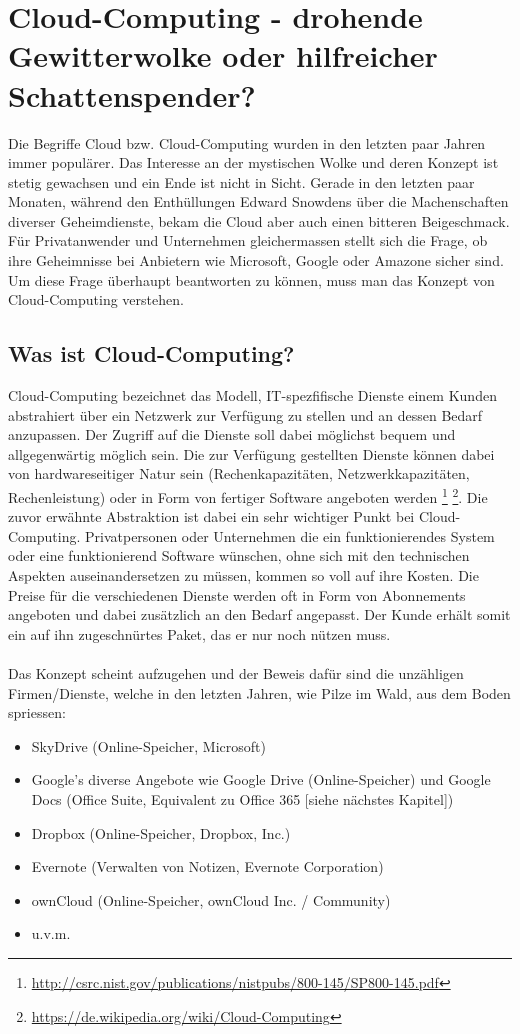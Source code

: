 \section{Cloud-Computing - drohende Gewitterwolke oder hilfreicher Schattenspender?}
Die Begriffe Cloud bzw. Cloud-Computing wurden in den letzten paar Jahren immer populärer. Das Interesse an der mystischen Wolke und deren Konzept ist stetig gewachsen und ein Ende ist nicht in Sicht. Gerade in den letzten paar Monaten, während den Enthüllungen Edward Snowdens über die Machenschaften diverser Geheimdienste, bekam die Cloud aber auch einen bitteren Beigeschmack. Für Privatanwender und Unternehmen gleichermassen stellt sich die Frage, ob ihre Geheimnisse bei Anbietern wie Microsoft, Google oder Amazone sicher sind. Um diese Frage überhaupt beantworten zu können, muss man das Konzept von Cloud-Computing verstehen.

\subsection{Was ist Cloud-Computing?}
Cloud-Computing bezeichnet das Modell, IT-spezfifische Dienste einem Kunden abstrahiert über ein Netzwerk zur Verfügung zu stellen und an dessen Bedarf anzupassen. Der Zugriff auf die Dienste soll dabei möglichst bequem und allgegenwärtig möglich sein. Die zur Verfügung gestellten Dienste können dabei von hardwareseitiger Natur sein (Rechenkapazitäten, Netzwerkkapazitäten, Rechenleistung) oder in Form von fertiger Software angeboten werden 
\footnote{\url{http://csrc.nist.gov/publications/nistpubs/800-145/SP800-145.pdf}} 
\footnote{\url{https://de.wikipedia.org/wiki/Cloud-Computing}}. 
Die zuvor erwähnte Abstraktion ist dabei ein sehr wichtiger Punkt bei Cloud-Computing. Privatpersonen oder Unternehmen die ein funktionierendes System oder eine funktionierend Software wünschen, ohne sich mit den technischen Aspekten auseinandersetzen zu müssen, kommen so voll auf ihre Kosten. Die Preise für die verschiedenen Dienste werden oft in Form von Abonnements angeboten und dabei zusätzlich an den Bedarf angepasst. Der Kunde erhält somit ein auf ihn zugeschnürtes Paket, das er nur noch nützen muss.
\\
\\
Das Konzept scheint aufzugehen und der Beweis dafür sind die unzähligen Firmen/Dienste, welche in den letzten Jahren, wie Pilze im Wald, aus dem Boden spriessen:
\begin{itemize}
\item SkyDrive (Online-Speicher, Microsoft)
\item Google's diverse Angebote wie Google Drive (Online-Speicher) und Google Docs (Office Suite, Equivalent zu Office 365 [siehe nächstes Kapitel])
\item Dropbox (Online-Speicher, Dropbox, Inc.)
\item Evernote (Verwalten von Notizen, Evernote Corporation)
\item ownCloud (Online-Speicher, ownCloud Inc. / Community)
\item u.v.m.
\end{itemize}

